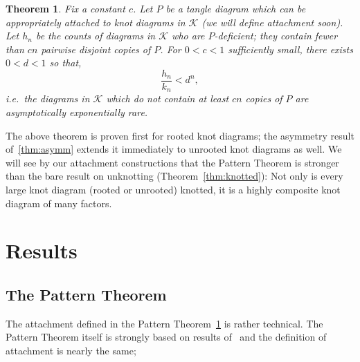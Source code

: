 \documentclass[submission%
]{dmtcs}
\newcommand{\KnotDiaClass}{\mathscr{K}}
\newcommand{\KnotDiaCard}{k}
\newtheorem{theorem}{Theorem}
\begin{document}
\begin{theorem}
  \label{thm:pattern}
  Fix a constant $c$. Let $P$ be a tangle diagram which can be
  appropriately attached to knot diagrams in $\KnotDiaClass$ (we will
  define attachment soon). Let $h_n$ be the counts of
  diagrams in $\KnotDiaClass$ who are \emph{$P$-deficient}; they
  contain fewer than $cn$ pairwise disjoint copies of $P$. For $0 < c
  < 1$ sufficiently small, there exists $0 < d < 1$ so that,
  \begin{displaymath}
    \frac{h_n}{\KnotDiaCard_n} < d^n,
  \end{displaymath}
  \textit{i.e.}\ the diagrams in $\KnotDiaClass$ which do not contain at least
  $cn$ copies of $P$ are asymptotically exponentially rare.
\end{theorem}

The above theorem is proven first for rooted knot diagrams; the
asymmetry result of~\ref{thm:asymm} extends it immediately to unrooted
knot diagrams as well. We will see by our attachment constructions
that the Pattern Theorem is stronger than the bare result on
unknotting (Theorem~\ref{thm:knotted}): Not only is every large knot diagram
(rooted or unrooted) knotted, it is a highly composite knot
diagram of many factors.

\section{Results}

\subsection{The Pattern Theorem}
\label{sec:pattern}

The attachment defined in the Pattern Theorem~\ref{thm:pattern} is
rather technical. The Pattern Theorem itself is strongly based on
results of~\cite{Bender1992104} and the definition of attachment is
nearly the same;
\end{document}
